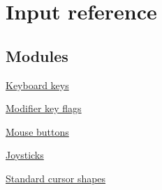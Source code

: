 \hypertarget{group__input}{}\section{Input reference}
\label{group__input}
\subsection*{Modules}
\begin{DoxyCompactItemize}
\item 
\hyperlink{group__keys}{Keyboard keys}
\item 
\hyperlink{group__mods}{Modifier key flags}
\item 
\hyperlink{group__buttons}{Mouse buttons}
\item 
\hyperlink{group__joysticks}{Joysticks}
\item 
\hyperlink{group__shapes}{Standard cursor shapes}
\end{DoxyCompactItemize}
